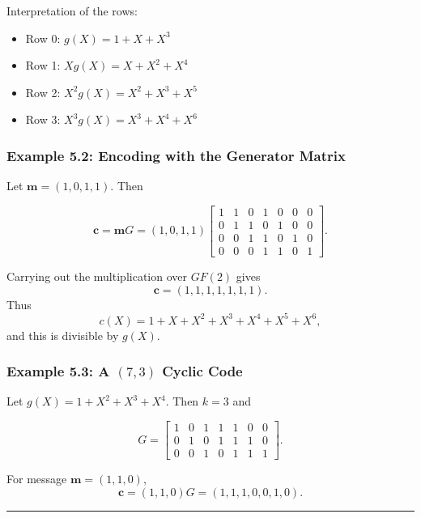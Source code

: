 \documentclass[
]{article}
\providecommand{\tightlist}{%
  \setlength{\itemsep}{0pt}\setlength{\parskip}{0pt}}
\begin{document}
Interpretation of the rows:

\begin{itemize}
\tightlist
\item
  Row 0: \(g(X)=1+X+X^3\)
\item
  Row 1: \(Xg(X)=X+X^2+X^4\)
\item
  Row 2: \(X^2g(X)=X^2+X^3+X^5\)
\item
  Row 3: \(X^3g(X)=X^3+X^4+X^6\)
\end{itemize}

\subsubsection{Example 5.2: Encoding with the Generator
Matrix}\label{example-5.2-encoding-with-the-generator-matrix}

Let \(\mathbf{m}=(1,0,1,1)\). Then

\[\mathbf{c} = \mathbf{m}G = (1,0,1,1)
\begin{bmatrix}
1 & 1 & 0 & 1 & 0 & 0 & 0 \\
0 & 1 & 1 & 0 & 1 & 0 & 0 \\
0 & 0 & 1 & 1 & 0 & 1 & 0 \\
0 & 0 & 0 & 1 & 1 & 0 & 1
\end{bmatrix}.\]

Carrying out the multiplication over \(GF(2)\) gives
\[\mathbf{c}=(1,1,1,1,1,1,1).\] Thus \[c(X)=1+X+X^2+X^3+X^4+X^5+X^6,\]
and this is divisible by \(g(X)\).

\subsubsection{\texorpdfstring{Example 5.3: A \((7,3)\) Cyclic
Code}{Example 5.3: A (7,3) Cyclic Code}}\label{example-5.3-a-73-cyclic-code}

Let \(g(X)=1+X^2+X^3+X^4\). Then \(k=3\) and

\[G = \begin{bmatrix}
1 & 0 & 1 & 1 & 1 & 0 & 0 \\
0 & 1 & 0 & 1 & 1 & 1 & 0 \\
0 & 0 & 1 & 0 & 1 & 1 & 1
\end{bmatrix}.\]

For message \(\mathbf{m}=(1,1,0)\),
\[\mathbf{c}=(1,1,0)G=(1,1,1,0,0,1,0).\]

\begin{center}\rule{0.5\linewidth}{0.5pt}\end{center}
\end{document}

